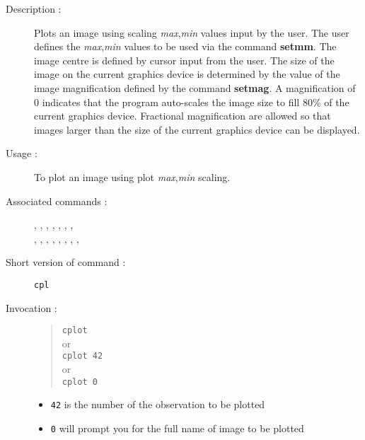 \begin{description}

\item[Description :] Plots an image using scaling {\it max},{\it min}
values input by the user.  The user defines the {\it max},{\it min}
values to be used via the command {\bf setmm}.  The image centre is
defined by cursor input from the user.  The size of the image on the
current graphics device is determined by the value of the image
magnification defined by the command {\bf setmag}.  A magnification of
0 indicates that the program auto-scales the image size to fill 80\% of
the current graphics device.  Fractional magnification are allowed so
that images larger than the size of the current graphics device can be
displayed.

\item[Usage :] To plot an image using plot {\it max},{\it min} scaling.

\item[Associated commands :] {\tt {}},
{\tt {}}, {\tt {}},
{\tt {}}, {\tt {}},
{\tt {}}, {\tt {}}, \\
{\tt {}}, {\tt {}},
{\tt {}}, {\tt {}},
{\tt {}}, {\tt {}},
{\tt {}}, {\tt {}},
{\tt {}}

\item[Short version of command :] {\tt cpl}
\item[Invocation :]

\begin{quote}{\tt  cplot }\\
or \\
{\tt cplot 42 }\\
or\\
{\tt cplot 0 }
\end{quote}

\begin{itemize}

\item {\tt 42} is the number of the observation to be plotted
\item {\tt 0} will prompt you for the full name of image to be plotted
\end{itemize}

\end{description}

